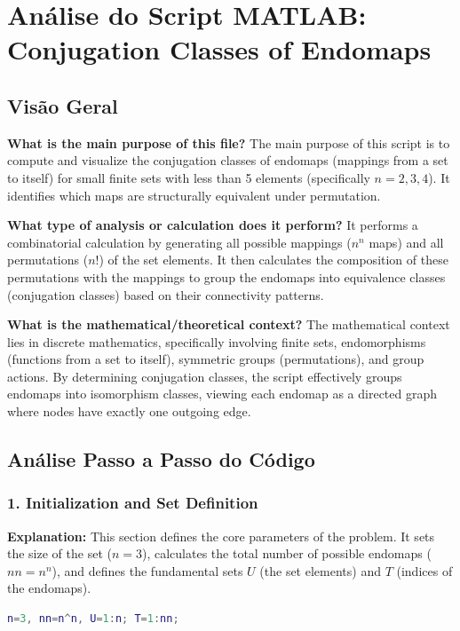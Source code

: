
\chapter{Análise do Script MATLAB: Conjugation Classes of Endomaps}
\author{Expert Software Engineer}
\section{Visão Geral}

\textbf{What is the main purpose of this file?}
The main purpose of this script is to compute and visualize the conjugation classes of endomaps (mappings from a set to itself) for small finite sets with less than 5 elements (specifically $n=2, 3, 4$). It identifies which maps are structurally equivalent under permutation.

\textbf{What type of analysis or calculation does it perform?}
It performs a combinatorial calculation by generating all possible mappings ($n^n$ maps) and all permutations ($n!$) of the set elements. It then calculates the composition of these permutations with the mappings to group the endomaps into equivalence classes (conjugation classes) based on their connectivity patterns. 

\textbf{What is the mathematical/theoretical context?}
The mathematical context lies in discrete mathematics, specifically involving finite sets, endomorphisms (functions from a set to itself), symmetric groups (permutations), and group actions. By determining conjugation classes, the script effectively groups endomaps into isomorphism classes, viewing each endomap as a directed graph where nodes have exactly one outgoing edge.

\section{Análise Passo a Passo do Código}

\subsection{1. Initialization and Set Definition}
\textbf{Explanation:} This section defines the core parameters of the problem. It sets the size of the set ($n=3$), calculates the total number of possible endomaps ($nn = n^n$), and defines the fundamental sets $U$ (the set elements) and $T$ (indices of the endomaps). 

\begin{lstlisting}[language=Matlab]
n=3, nn=n^n, U=1:n; T=1:nn;
\end{lstlisting}

